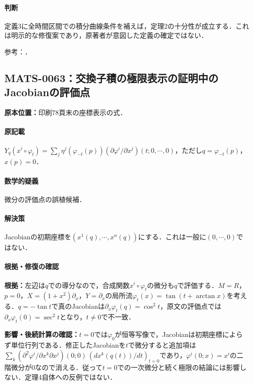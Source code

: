 \documentclass[a4paper,10pt]{ltjsarticle}
\begin{document}
\paragraph{判断}定義3に全時間区間での積分曲線条件を補えば，定理2の十分性が成立する．これは明示的な修復案であり，原著者が意図した定義の確定ではない．

\noindent 参考：\cite{paper2017}．

\subsection*{MATS-0063：交換子積の極限表示の証明中のJacobianの評価点}\label{math:MATS-0063}
\noindent\textbf{原本位置：}印刷78頁末の座標表示の式．

\paragraph{原記載}$Y_q(x^i\circ\varphi_t)=\sum_j\eta^j(\varphi_{-t}(p))(\partial\varphi^i/\partial x^j)(t;0,\cdots,0)$，ただし$q=\varphi_{-t}(p)$，$x(p)=0$．

\paragraph{数学的疑義}微分の評価点の誤植候補．

\paragraph{解決策}Jacobianの初期座標を$(x^1(q),\cdots,x^n(q))$にする．これは一般に$(0,\cdots,0)$ではない．

\paragraph{根拠・修復の確認}\textbf{根拠：}左辺は$q$での導分なので，合成関数$x^i\circ\varphi_t$の微分も$q$で評価する．$M=R$，$p=0$，$X=(1+x^2)\partial_x$，$Y=\partial_x$の局所流$\varphi_t(x)=\tan(t+\arctan x)$を考える．$q=-\tan t$で真のJacobianは$\partial_x\varphi_t(q)=\cos^2t$，原文の評価点では$\partial_x\varphi_t(0)=\sec^2t$となり，$t\ne0$で不一致．

\textbf{影響・後続計算の確認：}$t=0$では$\varphi_0$が恒等写像で，Jacobianは初期座標によらず単位行列である．修正したJacobianを$t$で微分すると追加項は$\sum_k(\partial^2\varphi^i/\partial x^k\partial x^j)(0;0)\,(d x^k(q(t))/dt)_{t=0}$であり，$\varphi^i(0;x)=x^i$の二階微分が0なので消える．従って$t=0$での一次微分と続く極限の結論には影響しない．定理4自体への反例ではない．
\end{document}
